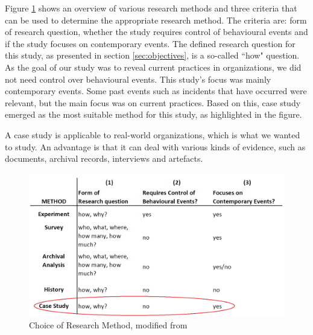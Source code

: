 \label{sec:choiceOfMethod}
Figure \ref{fig:methods} shows an overview of various research methods and three criteria that can be used to determine the appropriate research method. The criteria are: form of research question, whether the study requires control of behavioural events and if the study focuses on contemporary events. The defined research question for this study, as presented in section \ref{sec:objectives}, is a so-called ``how" question. As the goal of our study was to reveal current practices in organizations, we did not need control over behavioural events. This study's focus was mainly contemporary events. Some past events such as incidents that have occurred were relevant, but the main focus was on current practices. Based on this, case study emerged as the most suitable method for this study, as highlighted in the figure.

A case study is applicable to real-world organizations, which is what we wanted to study. An advantage is that it can deal with various kinds of evidence, such as documents, archival records, interviews and artefacts.

\begin{figure}[h]
\begin{center}
\includegraphics[scale=0.35]{methods.png}
\caption[Choice of Research Method]{Choice of Research Method, modified from \cite{CaseStudyResearch}}
\label{fig:methods}
\end{center}
\end{figure}

